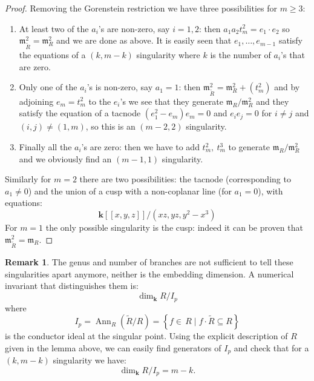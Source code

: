 \documentclass[11pt]{amsart}
\renewcommand{\k}{\mathbf k}
\theoremstyle{plain}
\theoremstyle{definition}
\newtheorem{remark}[thm]{Remark}
\begin{document}
\begin{proof}
Removing the Gorenstein restriction we have three possibilities for $m\geq 3$:
\begin{enumerate}
\item At least two of the $a_i$'s are non-zero, say $i=1,2$: then $a_1a_2t_m^2=e_1\cdot e_2$ so $\mathfrak{m}^2_{\widetilde{R}}=\mathfrak{m}^2_{R}$ and we are done as above. It is easily seen that  $e_1,\ldots, e_{m-1}$ satisfy the equations of a $(k,m-k)$ singularity where $k$ is the number of $a_i$'s that are zero.
\item Only one of the $a_i$'s is non-zero, say $a_1=1$: then $\mathfrak{m}^2_{\widetilde{R}}=\mathfrak{m}^2_{R}+(t_m^2)$ and by adjoining $e_m=t_m^2$ to the $e_i$'s we see that they generate $\mathfrak{m}_R/\mathfrak{m}^2_R$ and they satisfy the equation of a tacnode $(e_1^2-e_m)e_m=0$ and $e_ie_j=0$ for $i\neq j$ and $(i,j)\neq(1,m)$, so this is an $(m-2,2)$ singularity.
\item Finally all the $a_i$'s are zero: then we have to add $t_m^2,\ t_m^3$ to generate $\mathfrak{m}_R/\mathfrak{m}^2_R$ and we obviously find an $(m-1,1)$ singularity.
\end{enumerate}
\noindent Similarly for $m=2$ there are two possibilities: the tacnode (corresponding to $a_1\neq 0$) and the union of a cusp with a non-coplanar line (for $a_1=0$), with equations:
\[ \k[[x,y,z]]/(xz,yz,y^2-x^3)\]
\noindent For $m= 1$ the only possible singularity is the cusp: indeed it can be proven that $\mathfrak{m}^2_{\widetilde{R}}=\mathfrak{m}_{R}$. 
\end{proof}

\begin{remark}
 The genus and number of branches are not sufficient to tell these singularities apart anymore, neither is the embedding dimension. A numerical invariant that distinguishes them is:
\[ \dim_\k R/I_p \]
where 
\[I_p=\operatorname{Ann}_R(\widetilde R/R)=\left\{f\in\, R\;\rvert\; f\cdot\widetilde{R}\subseteq R\right\}\]
 is the conductor ideal at the singular point. 
 Using the explicit description of $R$ given in the lemma above, we can easily find generators of $I_p$ and check that for a $(k,m-k)$ singularity we have:
 \[ \dim_\k R/I_p=m-k.\]
\end{remark}
\end{document}
